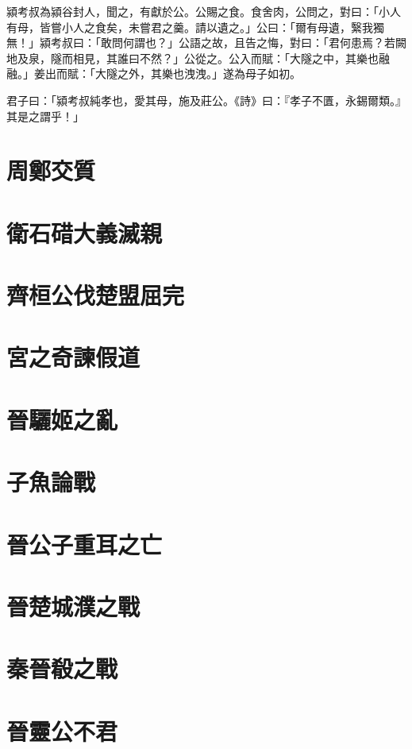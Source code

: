 \documentclass{article}
\begin{document}
潁考叔為潁谷封人，聞之，有獻於公。公賜之食。食舍肉，公問之，對曰：「小人有母，皆嘗小人之食矣，未嘗君之羹。請以遺之。」公曰：「爾有母遺，繄我獨無！」潁考叔曰：「敢問何謂也？」公語之故，且告之悔，對曰：「君何患焉？若闕地及泉，隧而相見，其誰曰不然？」公從之。公入而賦：「大隧之中，其樂也融融。」姜出而賦：「大隧之外，其樂也洩洩。」遂為母子如初。

君子曰：「潁考叔純孝也，愛其母，施及莊公。《詩》曰：『孝子不匱，永錫爾類。』其是之謂乎！」

\section{周鄭交質}

\section{衛石碏大義滅親}

\section{齊桓公伐楚盟屈完}

\section{宮之奇諫假道}

\section{晉驪姬之亂}

\section{子魚論戰}

\section{晉公子重耳之亡}

\section{晉楚城濮之戰}

\section{秦晉殽之戰}

\section{晉靈公不君}
\end{document}
